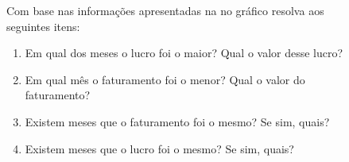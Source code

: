 \documentclass[oneside,a4paper,12pt]{article}
\begin{document}
\begin{enumerate}
\begin{figure}[!hbt]
\begin{multicols}{2}
Com base nas informações apresentadas na no gráfico resolva aos seguintes itens:
\begin{enumerate}
\item Em qual dos meses o lucro foi o maior? Qual o valor desse lucro? 
\item Em qual mês o faturamento foi o menor? Qual o valor do faturamento?
\item Existem meses que o faturamento foi o mesmo? Se sim, quais?
\item Existem meses que o lucro foi o mesmo? Se sim, quais?
\end{enumerate}

\end{multicols}
\end{figure}


\end{enumerate}
\end{document}
